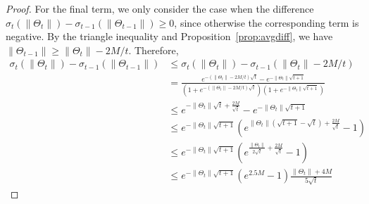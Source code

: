 \begin{proof}
	For the final term, we only consider the case when the difference  $\sigma_{t}(\|\Theta_{t}\|)-\sigma_{t-1}(\|\Theta_{t-1}\| ) \ge 0$, since otherwise the corresponding term is negative. By the triangle inequality and Proposition~\ref{prop:avgdiff}, we have
	$\|\Theta_{t-1}\| \ge \|\Theta_t\| - 2M/t$. Therefore,
	\begin{align*}
	\sigma_{t}(\|\Theta_{t}\|)-\sigma_{t-1}(\|\Theta_{t-1}\| ) 
	& \le \sigma_{t}(\|\Theta_{t}\|)-\sigma_{t-1}(\|\Theta_{t}\|- 2M/t ) \\
	& = \frac{e^{-(\|\Theta_{t}\|-2M/t)\sqrt{t}} - e^{-\|\Theta_t\|\sqrt{t+1}}}{\left(1+e^{-(\|\Theta_t\|-2M/t)\sqrt{t}}\right)
		\left(1+ e^{-\|\Theta_t\|\sqrt{t+1}}\right)} \\
	& \le e^{-\|\Theta_{t} \| \sqrt{t} + \tfrac{2M}{\sqrt{t}}} - e^{-\|\Theta_t\|\sqrt{t+1}} \\
	& \le e^{-\|\Theta_t\|\sqrt{t+1}} \left( e^{\|\Theta_t\| (\sqrt{t+1}-\sqrt{t}) + \tfrac{2M}{\sqrt{t}}} -1\right) \\
	& \le e^{-\|\Theta_t\|\sqrt{t+1}} \left( e^{\tfrac{\|\Theta_t\|}{2 \sqrt{t}} + \tfrac{2M}{\sqrt{t}}} -1\right) \\
	& \le e^{-\|\Theta_t\|\sqrt{t+1}} (e^{2.5M}-1) \frac{\|\Theta_t\|+4M}{5 \sqrt{t}} 
	\end{align*}
\end{proof}
\fi